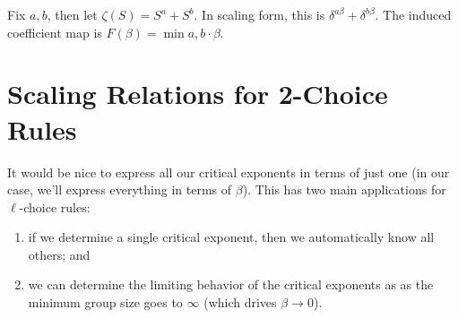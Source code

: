 \documentclass[twoside,10pt]{article}
\begin{document}
\begin{ex}
	Fix $a, b$, then let $\zeta(S) = S^{a} + S^{b}$. In scaling form, this is $\delta^{a \beta} + \delta^{b \beta}$. The induced coefficient map is $F(\beta) = \min{a,b} \cdot \beta$.
\end{ex}

\section{Scaling Relations for 2-Choice Rules}

It would be nice to express all our critical exponents in terms of just one (in our case, we'll express everything in terms of $\beta$). This has two main applications for $\ell$-choice rules:
\begin{enumerate}
	\item if we determine a single critical exponent, then we automatically know all others; and
	\item we can determine the limiting behavior of the critical exponents as as the minimum group size goes to $\infty$ (which drives $\beta\to 0$).
\end{enumerate}
\end{document}
